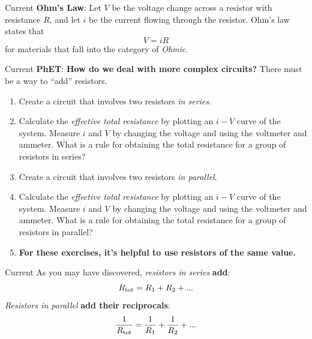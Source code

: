 \documentclass{beamer}
\begin{document}
\begin{frame}{Current}
\textbf{Ohm's Law}: Let $V$ be the voltage change across a resistor with resistance $R$, and let $i$ be the current flowing through the resistor.  Ohm's law states that
\begin{equation}
\boxed{
V = iR}
\end{equation}
for materials that fall into the category of \textit{Ohmic}.
\end{frame}

\begin{frame}{Current}
\small
\textbf{\alert{PhET}}: \textbf{How do we deal with more complex circuits?} There must be a way to ``add'' resistors.
\begin{enumerate}
\item Create a circuit that involves two resistors \textit{in series}.
\item Calculate the \textit{effective total resistance} by plotting an $i-V$ curve of the system.  Measure $i$ and $V$ by changing the voltage and using the voltmeter and ammeter.  What is a rule for obtaining the total resistance for a group of resistors in series?
\item Create a circuit that involves two resistors \textit{in parallel}.
\item Calculate the \textit{effective total resistance} by plotting an $i-V$ curve of the system.  Measure $i$ and $V$ by changing the voltage and using the voltmeter and ammeter.   What is a rule for obtaining the total resistance for a group of resistors in parallel?
\item \textbf{For these exercises, it's helpful to use resistors of the same value.}
\end{enumerate}
\end{frame}

\begin{frame}{Current}
As you may have discovered, \textit{resistors in series} \textbf{add}:
\begin{equation}
R_{\rm tot} = R_1 + R_2 + ...
\end{equation}
\textit{Resistors in parallel} \textbf{add their reciprocals}:
\begin{equation}
\frac{1}{R_{\rm tot}} = \frac{1}{R_1}+\frac{1}{R_2}+...
\end{equation}
\end{frame}
\end{document}
